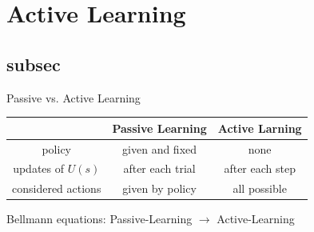 \section{Active Learning}
\subsection{subsec} %

\begin{frame}[c]{Passive vs. Active Learning}
	\begin{center}
		\begin{tabular}{ c|c|c } 
		    & Passive Learning & Active Larning\\ \hline
			policy & given and fixed & none \\ \hline
			updates of $U(s)$ & after each trial & after each step \\ \hline
			considered actions & given by policy & all possible \\
		\end{tabular}
	\end{center}
	
	\vspace{.5cm}
	Bellmann equations: Passive-Learning $\rightarrow$ Active-Learning
\end{frame}


